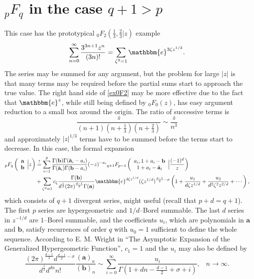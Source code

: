 \documentclass[12pt]{article}
\newcommand{\ee}[0] {\mathbbm{e}}
\numberwithin{equation}{section}
\newcommand{\Head}[3] {{}_{#1}{#2}_{#3}}
\newcommand{\FF}[6] {{}_{#1}{#2}_{#3} \left( \begin{array}{c} #4 \\ #5 \end{array} \Big| {#6}  \right)}
\newcommand{\FFf}[5] {{}_{#1}{#2}_{#3} \left(#4 | {#5} \right)}
\newcommand{\bfa}[0] {\mathbf{a}}
\newcommand{\bfb}[0] {\mathbf{b}}
\begin{document}
\section{$\Head{p}{F}{q}$ in the case $q+1>p$}
This case has the prototypical $\FFf{0}{F}{2}{\tfrac13, \tfrac23}{z}$ example
\begin{equation}
\label{ex0F2}
\sum_{n=0}^{\infty}\frac{3^{3n+1}z^n}{(3n)!} = \sum_{\zeta^3=1} \ee^{3\zeta z^{1/3}}\text{.}
\end{equation}
The series may be summed for any argument, but the problem for large $|z|$ is that many terms may be required before the partial sums start to approach the true value. The right hand side of \eqref{ex0F2} may be more effective due to the fact that $\ee^{z}$, while still being defined by ${}_0 F_0(z)$, has easy argument reduction to a small box around the origin. The ratio of successive terms is
\begin{equation*}
\frac{z}{(n+1) (n+\frac{1}{3}) (n+\frac{2}{3})} \sim \frac{z}{n^3}
\end{equation*}
and approximately $|z|^{1/3}$ terms have to be summed before the terms start to decrease. In this case, the formal expansion
\begin{equation}
\label{entirerecp}
\begin{alignedat}{1}
\FF{p}{F}{q}{\mathbf{a}}{\mathbf{b}}{z}&\overset{?}{=}\sum_{i=1}^{p} \frac{\Gamma(\mathbf{b}) \Gamma(\hat{\mathbf{a}}_i-a_i)}{\Gamma(\hat{\mathbf{a}}_i)\Gamma(\mathbf{b}-a_i)} (-z)^{-a_i} \FF{q+1}{F}{p-1}{a_i,1+a_i-\mathbf{b}}{1+a_i-\hat{\mathbf{a}}_i}{\frac{(-1)^d}{z}}\\
&+\sum_{\zeta^d=1} c_{\zeta} \frac{\Gamma(\mathbf{b})}{d^{\frac{1}{2}} (2 \pi )^{\frac{d-1}{2}} \Gamma(\mathbf{a})} \ee^{d \zeta z^{1/d}}(\zeta z^{1/d})^{\frac{d-1}{2}-\sigma} \left(1+\frac{u_1}{d \zeta z^{1/d}}+\frac{u_2}{d^2 \zeta^2 z^{2/d}}+\cdots\right)\text{,}
\end{alignedat}
\end{equation}
which consists of $q+1$ divergent series, might useful (recall that $p+d=q+1$). The first $p$ series are hypergeometric and $1/d$--Borel summable. The last $d$ series in $z^{-1/d}$ are $1$--Borel summable, and the coefficients $u_i$, which are polynomials in $\mathbf{a}$ and $\mathbf{b}$, satisfy recurrences of order $q$ with $u_0=1$ sufficient to define the whole sequence. According to E. M. Wright in ``The Asymptotic Expansion of the Generalized Hypergeometric Function'', $c_{1}=1$ and the $u_i$ may also be defined by
\begin{equation*}
\frac{(2 \pi )^{\frac{d-1}{2}} d^{\frac{d-1}{2}-\sigma
   }}{d^{\frac12} d^{dn}n!}\frac{(\bfa)_n}{(\bfb)_n} \sim \sum_{i=0}^{\infty}\frac{u_i}{\Gamma \left(1+d
   n-\frac{d-1}{2}+\sigma+i\right)}\text{,} \quad n \to \infty\text{.}
\end{equation*}
\end{document}
